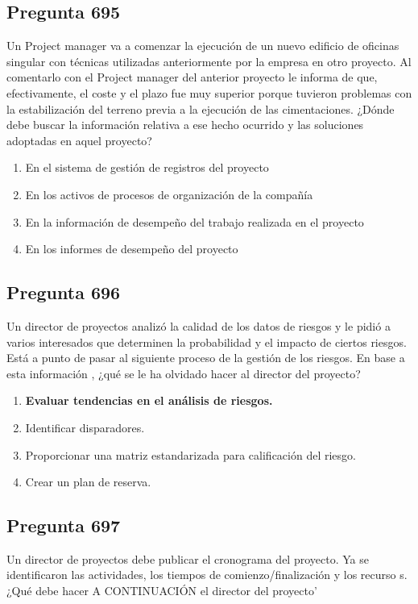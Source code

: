 \documentclass[11pt,a4paper]{article}
\begin{document}
\subsection*{Pregunta 695}
Un Project manager va a comenzar la ejecución de un nuevo edificio de oficinas singular con técnicas utilizadas anteriormente por la empresa en otro proyecto. Al comentarlo con el Project manager del anterior proyecto le informa de que, efectivamente, el coste y el plazo fue muy superior porque tuvieron problemas con la estabilización del terreno previa a la ejecución de las cimentaciones. ¿Dónde debe buscar la información relativa a ese hecho ocurrido y las soluciones adoptadas en aquel proyecto?

\begin{enumerate}[label=\alph*)]
  \item En el sistema de gestión de registros del proyecto
  \item En los activos de procesos de organización de la compañía
  \item En la información de desempeño del trabajo realizada en el proyecto
  \item En los informes de desempeño del proyecto
\end{enumerate}

\subsection*{Pregunta 696}
Un director de proyectos analizó la calidad de los datos de riesgos y le pidió a varios interesados que determinen la probabilidad y el impacto de ciertos riesgos. Está a punto de pasar al siguiente proceso de la gestión de los riesgos. En base a esta información , ¿qué se le ha olvidado hacer al director del proyecto?

\begin{enumerate}[label=\alph*)]
  \item \textbf{Evaluar tendencias en el análisis de riesgos.}
  \item Identificar disparadores.
  \item Proporcionar una matriz estandarizada para calificación del riesgo.
  \item Crear un plan de reserva.
\end{enumerate}

\subsection*{Pregunta 697}
Un director de proyectos debe publicar el cronograma del proyecto. Ya se identificaron las actividades, los tiempos de comienzo/finalización y los recurso s. ¿Qué debe hacer A CONTINUACIÓN el director del proyecto'
\end{document}
